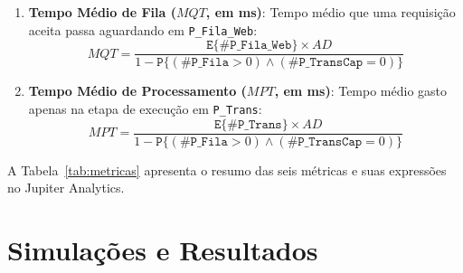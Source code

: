 \documentclass[conference,10pt]{IEEEtran}
\begin{document}
\begin{enumerate}
    \item \textbf{Tempo Médio de Fila ($MQT$, em ms)}: Tempo médio que uma requisição aceita passa aguardando em \texttt{P\_Fila\_Web}:
    \begin{equation}
        MQT = \frac{\texttt{E}\{\#\texttt{P\_Fila\_Web}\} \times AD}{1 - \texttt{P}\{(\#\texttt{P\_Fila} > 0) \land (\#\texttt{P\_TransCap} = 0)\}}
        \label{eq:mqt}
    \end{equation}

    \item \textbf{Tempo Médio de Processamento ($MPT$, em ms)}: Tempo médio gasto apenas na etapa de execução em \texttt{P\_Trans}:
    \begin{equation}
        MPT = \frac{\texttt{E}\{\#\texttt{P\_Trans}\} \times AD}{1 - \texttt{P}\{(\#\texttt{P\_Fila} > 0) \land (\#\texttt{P\_TransCap} = 0)\}}
        \label{eq:mpt}
    \end{equation}
\end{enumerate}

A Tabela~\ref{tab:metricas} apresenta o resumo das seis métricas e suas expressões no Jupiter Analytics.

\begin{table}[htbp]
\centering
\caption{Expressões das Métricas Utilizados no Modelo SPN}
\label{tab:metricas}
\renewcommand{\arraystretch}{1.15}
\setlength{\tabcolsep}{3pt}
\end{table}

\section{Simulações e Resultados}
\end{document}
